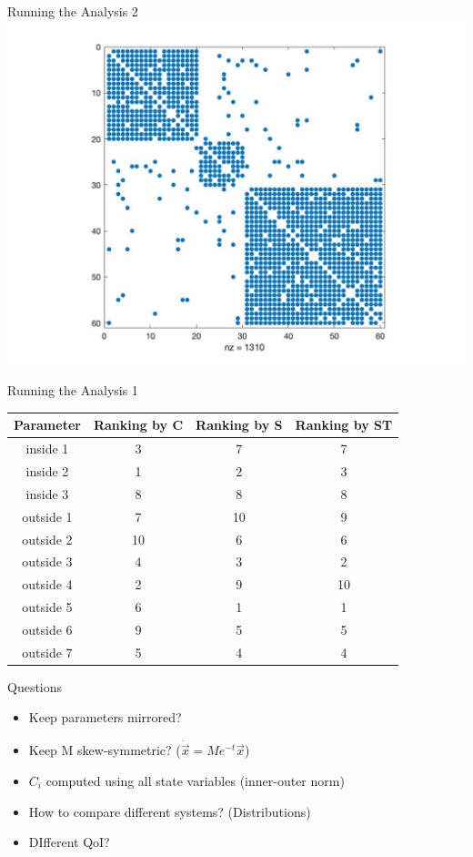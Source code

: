 \documentclass{beamer}
\begin{document}
\begin{frame}{Running the Analysis 2}
	\includegraphics[width=\textwidth]{spy4.jpg}
\end{frame}


\begin{frame}{Running the Analysis 1}
	\centering
	\begin{tabular}{|c|c|c|c|}
		\hline
		Parameter & Ranking by C & Ranking by S & Ranking by ST \\
		\hline
		inside 1 & 3 & 7 & 7 \\
		\hline
		inside 2 & 1 & 2 & 3 \\
		\hline
		inside 3 & 8 & 8 & 8 \\
		\hline
		outside 1 & 7 & 10 & 9 \\
		\hline
		outside 2 & 10 & 6 & 6 \\
		\hline
		outside 3 & 4 & 3 & 2 \\
		\hline
		outside 4 & 2 & 9 & 10 \\
		\hline
		outside 5 & 6 & 1 & 1 \\
		\hline
		outside 6 & 9 & 5 & 5 \\
		\hline
		outside 7 & 5 & 4 & 4 \\
		\hline
	\end{tabular}
\end{frame}

\begin{frame}{Questions}
	\begin{itemize}
		\item Keep parameters mirrored?
		\item Keep M skew-symmetric? ($\dot{\vec{x}}=Me^{-t}\vec{x}$)
		\item $C_i$ computed using all state variables (inner-outer norm)
		\item How to compare different systems? (Distributions)
		\item DIfferent QoI?
	\end{itemize}
\end{frame}
\end{document}
